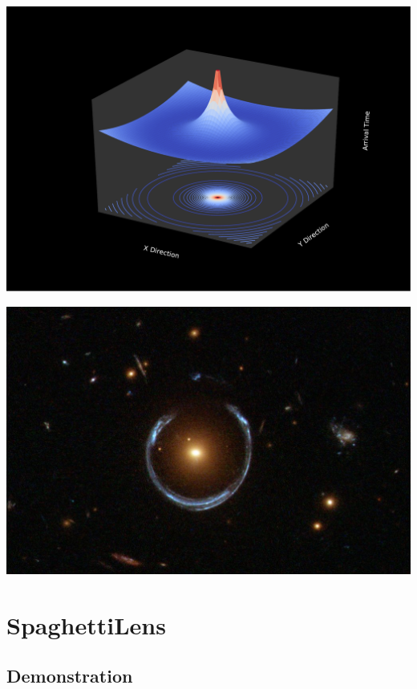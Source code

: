 \documentclass[aspectratio=1610]{beamer}
\begin{document}
\begin{frame}
  \includegraphics[width=\textwidth]{imgs/fig2}
\end{frame}

\begin{frame}
  \includegraphics[width=\textwidth]{imgs/einsteinring}
\end{frame}

\section{SpaghettiLens}
\subsection{Demonstration}
\end{document}
